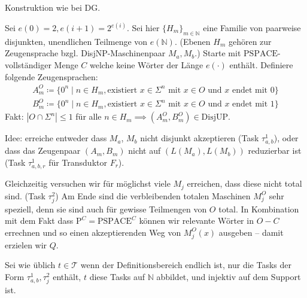 \documentclass[nofonts]{uebung}
\def\P{\ensuremath{\mathrm{P}}}
\def\DisjUP{\ensuremath{\mathrm{DisjUP}}}
\begin{document}
Konstruktion wie bei DG.

Sei $e(0)=2, e(i+1)=2^{e(i)}$. Sei hier $\{H_m\}_{m\in\mathbb N}$ eine Familie von paarweise disjunkten, unendlichen Teilmenge von $e(\mathbb N)$. (Ebenen $H_m$ gehören zur Zeugensprache bzgl. DisjNP-Maschinenpaar $M_a, M_b$.)
Starte mit $\mathrm{PSPACE}$-vollständiger Menge $C$ welche keine Wörter der Länge $e(\cdot)$ enthält.
Definiere folgende Zeugensprachen:
        \begin{gather*}
            A_m^O \coloneqq \{ 0^n \mid n\in H_m, \text{existiert $x\in \Sigma^{n}$ mit } x\in O \text{ und $x$ endet mit $0$} \}\\
            B_m^O \coloneqq \{ 0^n \mid n\in H_m, \text{existiert $x\in \Sigma^{n}$ mit } x\in O \text{ und $x$ endet mit $1$} \}
        \end{gather*}
        Fakt: $|O\cap \Sigma^n|\leq 1$ für alle $n\in H_m \implies (A_m^O, B_m^O)\in\DisjUP$.
    
\medskip

Idee: erreiche entweder dass $M_a$, $M_b$ nicht disjunkt akzeptieren (Task $\tau^1_{a,b}$), oder dass das Zeugenpaar $(A_m,B_m)$ nicht auf $(L(M_a),L(M_b))$ reduzierbar ist (Task $\tau^1_{a,b,r}$ für Transduktor $F_r$).

Gleichzeitig versuchen wir für möglichst viele $M_j$ erreichen, dass diese nicht total sind. (Task $\tau^2_j$)
Am Ende sind die verbleibenden totalen Maschinen $M^O_j$ sehr speziell, denn sie sind auch für gewisse Teilmengen von $O$ total.
In Kombination mit dem Fakt dass $\P^C=\mathrm{PSPACE}^C$ können wir relevante Wörter in $O-C$ errechnen und so einen akzeptierenden Weg von $M^O_j(x)$ ausgeben -- damit erzielen wir $Q$.
\medskip

Sei wie üblich $t\in \mathcal T$ wenn der Definitionsbereich endlich ist, nur die Tasks der Form $\tau^1_{a,b}, \tau^2_j$ enthält, $t$ diese Tasks auf $\mathbb N$ abbildet, und injektiv auf dem Support ist.
\end{document}
